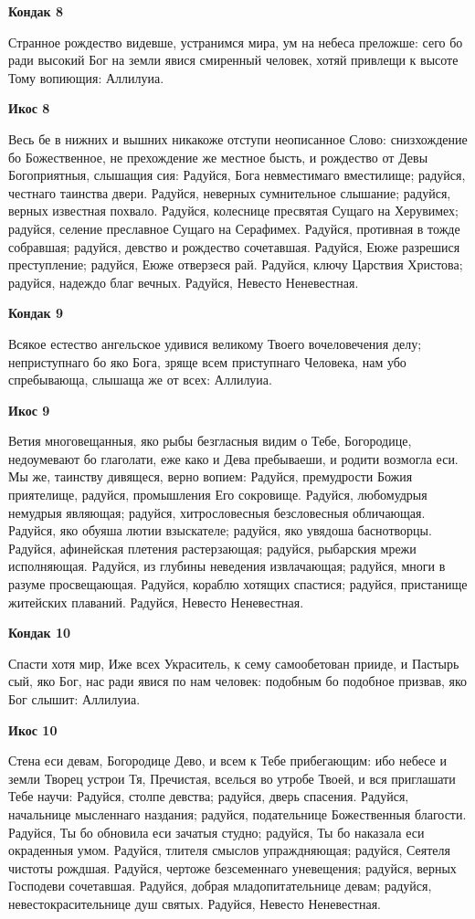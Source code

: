 \bfseries Кондак 8\normalfont{}


Странное рождество видевше, устранимся мира, ум на небеса преложше: сего бо ради высокий Бог на земли явися смиренный человек, хотяй привлещи к высоте Тому вопиющия: Аллилуиа.


\bfseries Икос 8\normalfont{}


Весь бе в нижних и вышних никакоже отступи неописанное Слово: снизхождение бо Божественное, не прехождение же местное бысть, и рождество от Девы Богоприятныя, слышащия сия: Радуйся, Бога невместимаго вместилище; радуйся, честнаго таинства двери. Радуйся, неверных сумнительное слышание; радуйся, верных известная похвало. Радуйся, колеснице пресвятая Сущаго на Херувимех; радуйся, селение преславное Сущаго на Серафимех. Радуйся, противная в тожде собравшая; радуйся, девство и рождество сочетавшая. Радуйся, Еюже разрешися преступление; радуйся, Еюже отверзеся рай. Радуйся, ключу Царствия Христова; радуйся, надеждо благ вечных. Радуйся, Невесто Неневестная.


\bfseries Кондак 9\normalfont{}


Всякое естество ангельское удивися великому Твоего вочеловечения делу; неприступнаго бо яко Бога, зряще всем приступнаго Человека, нам убо спребывающа, слышаща же от всех: Аллилуиа.


\bfseries Икос 9\normalfont{}


Ветия многовещанныя, яко рыбы безгласныя видим о Тебе, Богородице, недоумевают бо глаголати, еже како и Дева пребываеши, и родити возмогла еси. Мы же, таинству дивящеся, верно вопием: Радуйся, премудрости Божия приятелище, радуйся, промышления Его сокровище. Радуйся, любомудрыя немудрыя являющая; радуйся, хитрословесныя безсловесныя обличающая. Радуйся, яко обуяша лютии взыскателе; радуйся, яко увядоша баснотворцы. Радуйся, афинейская плетения растерзающая; радуйся, рыбарския мрежи исполняющая. Радуйся, из глубины неведения извлачающая; радуйся, многи в разуме просвещающая. Радуйся, кораблю хотящих спастися; радуйся, пристанище житейских плаваний. Радуйся, Невесто Неневестная.


\bfseries Кондак 10\normalfont{}


Спасти хотя мир, Иже всех Украситель, к сему самообетован прииде, и Пастырь сый, яко Бог, нас ради явися по нам человек: подобным бо подобное призвав, яко Бог слышит: Аллилуиа.


\bfseries Икос 10\normalfont{}


Стена еси девам, Богородице Дево, и всем к Тебе прибегающим: ибо небесе и земли Творец устрои Тя, Пречистая, вселься во утробе Твоей, и вся приглашати Тебе научи: Радуйся, столпе девства; радуйся, дверь спасения. Радуйся, начальнице мысленнаго наздания; радуйся, подательнице Божественныя благости. Радуйся, Ты бо обновила еси зачатыя студно; радуйся, Ты бо наказала еси окраденныя умом. Радуйся, тлителя смыслов упраждняющая; радуйся, Сеятеля чистоты рождшая. Радуйся, чертоже безсеменнаго уневещения; радуйся, верных Господеви сочетавшая. Радуйся, добрая младопитательнице девам; радуйся, невестокрасительнице душ святых. Радуйся, Невесто Неневестная.


